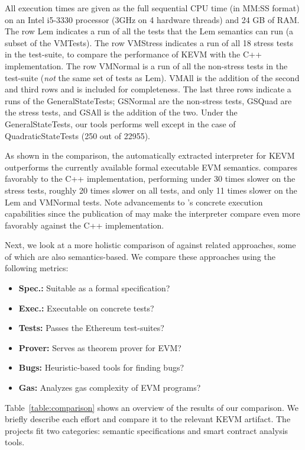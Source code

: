 All execution times are given as the full sequential CPU time (in MM:SS format)
  on an Intel i5-3330 processor (3GHz on 4 hardware threads) and 24 GB of RAM.
The row Lem indicates a run of all the tests that the Lem semantics
can run (a subset of the VMTests).
The row VMStress indicates a run of all 18 stress tests in the test-suite,
    to compare the performance of KEVM with the C++ implementation.
The row VMNormal is a run of all the non-stress
tests in the test-suite (\textit{not} the same set of tests as Lem).
VMAll is the addition of the second and third rows and is included for completeness.
The last three rows indicate a runs of the GeneralStateTests;
GSNormal are the non-stress tests, GSQuad are the stress tests,
         and GSAll is the addition of the two.
Under the GeneralStateTests, our tools performs well except
in the case of QuadraticStateTests (250 out of 22955).

As shown in the comparison,
   the automatically extracted interpreter for KEVM outperforms
   the currently available formal executable EVM semantics.
\KEVM{} compares favorably to the C++ implementation,
     performing under 30 times slower on the stress tests,
     roughly 20 times slower on all tests, and
     only 11 times slower on the Lem and VMNormal tests. Note
     advancements to \K's concrete execution capabilities since
     the publication of \cite{HildenbrandtCSF18} may
     make the \KEVM{} interpreter compare even more favorably against the
     C++ implementation.

Next, we look at a more holistic comparison of \KEVM{} against related approaches,
some of which are also semantics-based. We compare these approaches using the
following metrics:
\begin{itemize}
    \item \textbf{Spec.:} Suitable as a formal specification?
    \item \textbf{Exec.:} Executable on concrete tests?
    \item \textbf{Tests:} Passes the Ethereum test-suites?
    \item \textbf{Prover:} Serves as theorem prover for EVM?
    \item \textbf{Bugs:} Heuristic-based tools for finding bugs?
    \item \textbf{Gas:} Analyzes gas complexity of EVM programs?
\end{itemize}

Table~\ref{table:comparison} shows an overview of the results of our comparison.
We briefly describe each effort and compare it to the relevant KEVM artifact.
The projects fit two categories: semantic specifications and smart contract analysis tools.



